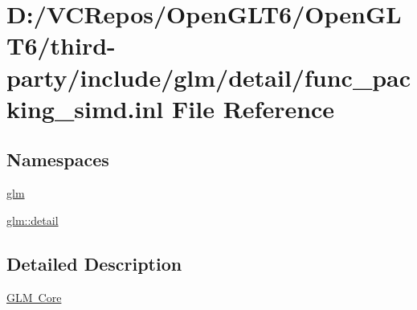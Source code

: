 \hypertarget{func__packing__simd_8inl}{}\section{D\+:/\+V\+C\+Repos/\+Open\+G\+L\+T6/\+Open\+G\+L\+T6/third-\/party/include/glm/detail/func\+\_\+packing\+\_\+simd.inl File Reference}
\label{func__packing__simd_8inl}
\subsection*{Namespaces}
\begin{DoxyCompactItemize}
\item 
 \mbox{\hyperlink{namespaceglm}{glm}}
\item 
 \mbox{\hyperlink{namespaceglm_1_1detail}{glm\+::detail}}
\end{DoxyCompactItemize}


\subsection{Detailed Description}
\mbox{\hyperlink{group__core}{G\+LM Core}} 